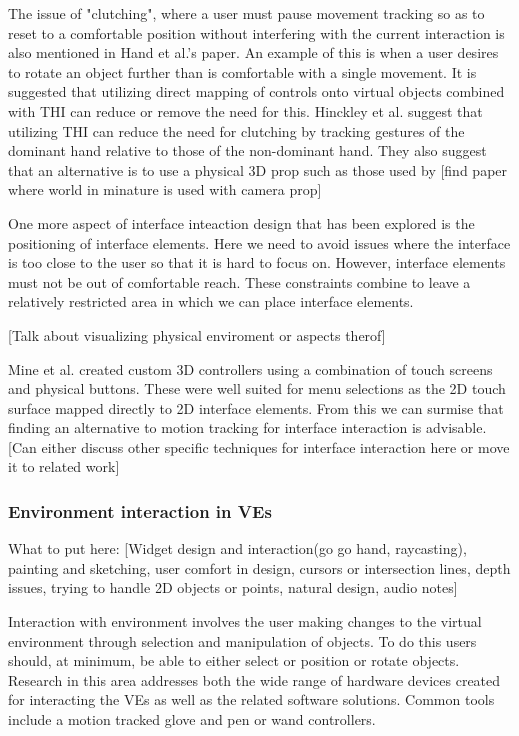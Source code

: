 \documentclass{sig-alternate-05-2015}
\begin{document}
 The issue of "clutching", where a user must pause movement tracking so as to reset to a comfortable position without interfering with the current interaction is also mentioned in Hand et al.'s paper.\cite{Hand1997} An example of this is when a user desires to rotate an object further than is comfortable with a single movement. It is suggested that utilizing direct mapping of controls onto virtual objects combined with THI can reduce or remove the need for this.\cite{Hand1997}  Hinckley et al. suggest that utilizing THI can reduce the need for clutching by tracking gestures of the dominant hand relative to those of the non-dominant hand.\cite{Hinckley1994} They also suggest that an alternative is to use a physical 3D prop such as those used by [find paper where world in minature is used with camera prop]
 
 One more aspect of interface inteaction design that has been explored is the positioning of interface elements.\cite{alger2015visual} Here we need to avoid issues where the interface is too close to the user so that it is hard to focus on. However, interface elements must not be out of comfortable reach. These constraints combine to leave a relatively restricted area in which we can place interface elements.
 
 [Talk about visualizing physical enviroment or aspects therof] 
 
 Mine et al. created custom 3D controllers using a combination of touch screens and physical buttons.\cite{Mine2014} These were well suited for menu selections as the 2D touch surface mapped directly to 2D interface elements. From this we can surmise that finding an alternative to motion tracking for interface interaction is advisable. [Can either discuss other specific techniques for interface interaction here or move it to related work]
 
 
\subsubsection{Environment interaction in VEs}
What to put here: [Widget design and interaction(go go hand, raycasting), painting and sketching, user comfort in design, cursors or intersection lines, depth issues, trying to handle 2D objects or points, natural design, audio notes]


 Interaction with environment involves the user making changes to the virtual environment through selection and manipulation of objects. To do this users should, at minimum, be able to either select or position or rotate objects\cite{Bowman2001}. Research in this area addresses both the wide range of hardware devices created for interacting the VEs as well as the related software solutions. Common tools include a motion tracked glove \cite{Zimmerman1986} and pen or wand controllers.\cite{Schultheis2012}
 
\end{document}

